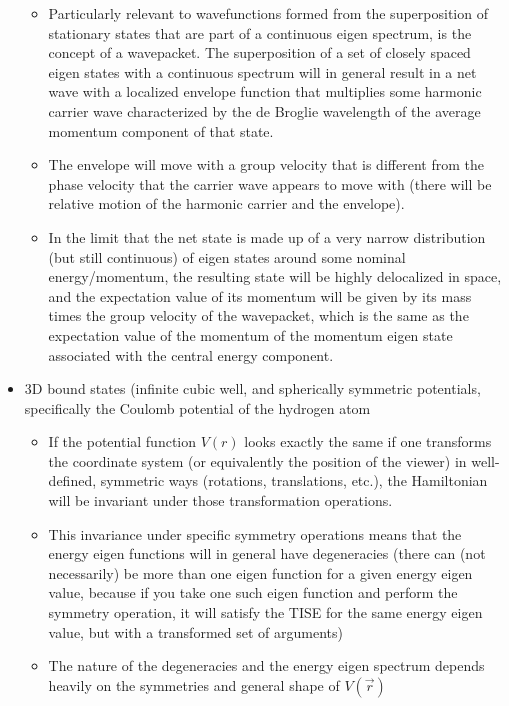\documentclass{article}
\begin{document}
\begin{itemize}
\begin{itemize}
        \item Particularly relevant to wavefunctions formed from the superposition of stationary states that are part of a continuous eigen spectrum, is the concept of a wavepacket.  The superposition of a set of closely spaced eigen states with a continuous spectrum will in general result in a net wave with a localized envelope function that multiplies some harmonic carrier wave characterized by the de Broglie wavelength of the average momentum component of that state.
        \item The envelope will move with a group velocity that is different from the phase velocity that the carrier wave appears to move with (there will be relative motion of the harmonic carrier and the envelope).
        \item In the limit that the net state is made up of a very narrow distribution (but still continuous) of eigen states around some nominal energy/momentum, the resulting state will be highly delocalized in space, and the expectation value of its momentum will be given by its mass times the group velocity of the wavepacket, which is the same as the expectation value of the  momentum of the momentum eigen state associated with the central energy component.
    \end{itemize}
    
    \item 3D bound states (infinite cubic well, and spherically symmetric potentials, specifically the Coulomb potential of the hydrogen atom
    
    \begin{itemize}
        \item If the potential function $V(r)$ looks exactly the same if one transforms the coordinate system (or equivalently the position of the viewer) in well-defined, symmetric ways (rotations, translations, etc.), the Hamiltonian will be invariant under those transformation operations.  
        \item This invariance under specific symmetry operations means that the energy eigen functions will in general have degeneracies (there can (not necessarily) be more than one eigen function for a given energy eigen value, because if you take one such eigen function and perform the symmetry operation, it will satisfy the TISE for the same energy eigen value, but with a transformed set of arguments) 
        
        \item The nature of the degeneracies and the energy eigen spectrum depends heavily on the symmetries and general shape of $V(\vec{r})$
        

\end{itemize}
\end{itemize}
\end{document}
